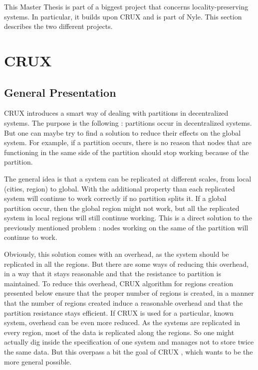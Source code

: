 \documentclass[a4paper,11pt,oneside]{report}
\begin{document}
This Master Thesis is part of a biggest project that concerns
locality-preserving systems. In particular, it builds upon
CRUX \cite{Basescu2014} and is part of Nyle. This section describes the two
different projects. 

\section{CRUX}

\subsection{General Presentation}
CRUX \cite{Basescu2014} introduces a smart way of dealing with partitions in
decentralized systems. The purpose is the following : partitions occur in
decentralized systems. But one can maybe try to find a solution to reduce their
effects on the global system. For example, if a partition occurs, there is no
reason that nodes that are functioning in the same side of the partition should
stop working because of the partition. 

The general idea is that a system can be replicated at different scales, from
local (cities, region) to global.  With the additional property than each
replicated system will continue to work correctly if no partition splits it. If
a global partition occur, then the global region might not work, but all the
replicated system in local regions will still continue working. This is a
direct solution to the previously mentioned problem : nodes working on the same
of the partition will continue to work.

Obviously, this solution comes with an overhead, as the system should be
replicated in all the regions. But there are some ways of reducing this
overhead, in a way that it stays reasonable and that the resistance to
partition is maintained. To reduce this overhead, CRUX \cite{Basescu2014}
algorithm for regions creation presented below ensure that the proper number of
regions is created, in a manner that the number of regions created induce a
reasonable overhead and that the partition resistance stays efficient. If CRUX
\cite{Basescu2014} is used for a particular, known system, overhead can be even
more reduced.  As the systems are replicated in every region, most of the data
is replicated along the regions. So one might actually dig inside the
specification of one system and manages not to store twice the same data. But
this overpass a bit the goal of CRUX \cite{Basescu2014}, which wants to be the
more general possible. 
\end{document}
